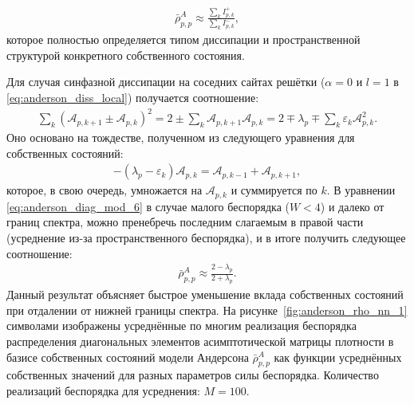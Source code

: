 \begin{equation}
\label{eq:anderson_diag_mod_5}
\begin{gathered}
\bar{\rho}^A_{p,p} \approx \frac{\sum_k I^{+}_{p,k}}{ \sum_k I^{-}_{p,k}}, 
\end{gathered}
\end{equation}
которое полностью определяется типом диссипации и пространственной структурой конкретного собственного состояния.

Для случая синфазной диссипации на соседних сайтах решётки (\(\alpha=0\) и \(l=1\) в \cref{eq:anderson_diss_local}) получается соотношение:
\begin{equation}
\label{eq:anderson_diag_mod_6}
\begin{gathered}
\sum_k \left( \mathcal{A}_{p, k+1} \pm \mathcal{A}_{p, k} \right)^2 = 2 \pm \sum_k \mathcal{A}_{p, k+1} \mathcal{A}_{p, k} = 2 \mp \lambda_p \mp \sum_k \varepsilon_k \mathcal{A}^2_{p, k}.
\end{gathered}
\end{equation}
Оно основано на тождестве, полученном из следующего уравнения для собственных состояний:
\begin{equation}
\label{eq:anderson_diag_mod_7}
\begin{gathered}
-\left( \lambda_p - \varepsilon_k \right) \mathcal{A}_{p, k} = \mathcal{A}_{p, k-1} + \mathcal{A}_{p, k+1},
\end{gathered}
\end{equation}
которое, в свою очередь, умножается на \(\mathcal{A}_{p, k}\) и суммируется по \(k\).
В уравнении \cref{eq:anderson_diag_mod_6} в случае малого беспорядка (\(W < 4\)) и далеко от границ спектра, можно пренебречь последним слагаемым в правой части (усреднение из-за пространственного беспорядка), и в итоге получить следующее соотношение:
\begin{equation}
\label{eq:anderson_diag_mod_8}
\begin{gathered}
\bar{\rho}^A_{p,p} \approx \frac{2-\lambda_p}{2+\lambda_p}.
\end{gathered}
\end{equation}
Данный результат объясняет быстрое уменьшение вклада собственных состояний при отдалении от нижней границы спектра.
На рисунке~\cref{fig:anderson_rho_nn_1} символами изображены усреднённые по многим реализация беспорядка распределения диагональных элементов асимптотической матрицы плотности в базисе собственных состояний модели Андерсона \(\bar{\rho}^A_{p,p}\) как функции усреднённых собственных значений для разных параметров силы беспорядка. Количество реализаций беспорядка для усреднения: \(M=100\).
